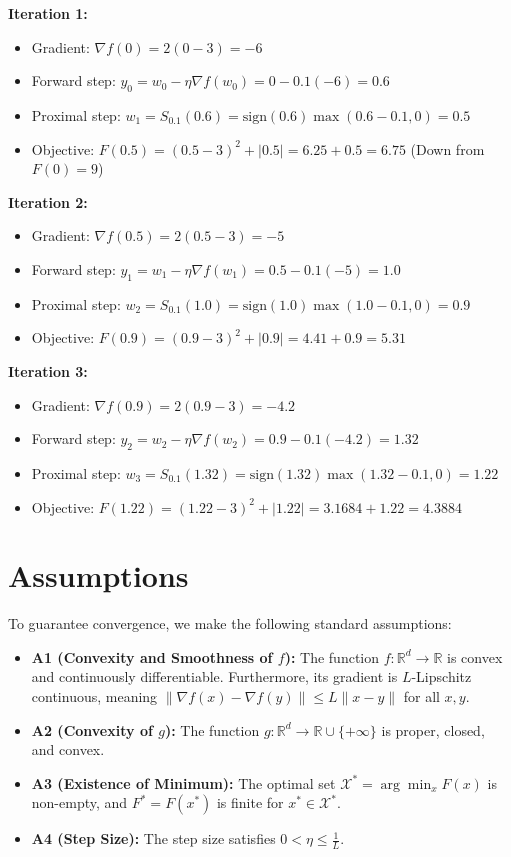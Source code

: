 \documentclass[11pt]{article}
\begin{document}
\textbf{Iteration 1:}
\begin{itemize}
    \item Gradient: $\nabla f(0) = 2(0-3) = -6$
    \item Forward step: $y_0 = w_0 - \eta \nabla f(w_0) = 0 - 0.1(-6) = 0.6$
    \item Proximal step: $w_1 = S_{0.1}(0.6) = \text{sign}(0.6)\max(0.6 - 0.1, 0) = 0.5$
    \item Objective: $F(0.5) = (0.5-3)^2 + |0.5| = 6.25 + 0.5 = 6.75$ (Down from $F(0) = 9$)
\end{itemize}

\textbf{Iteration 2:}
\begin{itemize}
    \item Gradient: $\nabla f(0.5) = 2(0.5-3) = -5$
    \item Forward step: $y_1 = w_1 - \eta \nabla f(w_1) = 0.5 - 0.1(-5) = 1.0$
    \item Proximal step: $w_2 = S_{0.1}(1.0) = \text{sign}(1.0)\max(1.0 - 0.1, 0) = 0.9$
    \item Objective: $F(0.9) = (0.9-3)^2 + |0.9| = 4.41 + 0.9 = 5.31$
\end{itemize}

\textbf{Iteration 3:}
\begin{itemize}
    \item Gradient: $\nabla f(0.9) = 2(0.9-3) = -4.2$
    \item Forward step: $y_2 = w_2 - \eta \nabla f(w_2) = 0.9 - 0.1(-4.2) = 1.32$
    \item Proximal step: $w_3 = S_{0.1}(1.32) = \text{sign}(1.32)\max(1.32 - 0.1, 0) = 1.22$
    \item Objective: $F(1.22) = (1.22-3)^2 + |1.22| = 3.1684 + 1.22 = 4.3884$
\end{itemize}

\section*{Assumptions}
To guarantee convergence, we make the following standard assumptions:
\begin{itemize}
    \item \textbf{A1 (Convexity and Smoothness of $f$):} The function $f: \mathbb{R}^d \to \mathbb{R}$ is convex and continuously differentiable. Furthermore, its gradient is $L$-Lipschitz continuous, meaning $\|\nabla f(x) - \nabla f(y)\| \le L \|x - y\|$ for all $x, y$.
    \item \textbf{A2 (Convexity of $g$):} The function $g: \mathbb{R}^d \to \mathbb{R} \cup \{+\infty\}$ is proper, closed, and convex.
    \item \textbf{A3 (Existence of Minimum):} The optimal set $\mathcal{X}^* = \arg\min_x F(x)$ is non-empty, and $F^* = F(x^*)$ is finite for $x^* \in \mathcal{X}^*$.
    \item \textbf{A4 (Step Size):} The step size satisfies $0 < \eta \le \frac{1}{L}$.
\end{itemize}
\end{document}
